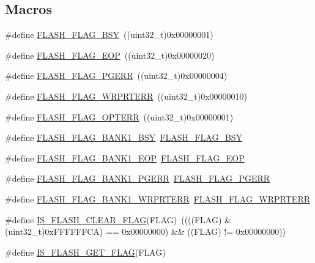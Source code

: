 \subsection*{Macros}
\begin{DoxyCompactItemize}
\item 
\#define \hyperlink{group___f_l_a_s_h___flags_gad3bc368f954ad7744deda3315da2fff7}{F\+L\+A\+S\+H\+\_\+\+F\+L\+A\+G\+\_\+\+B\+SY}~((uint32\+\_\+t)0x00000001)
\item 
\#define \hyperlink{group___f_l_a_s_h___flags_gaf043ba4d8f837350bfc7754a99fae5a9}{F\+L\+A\+S\+H\+\_\+\+F\+L\+A\+G\+\_\+\+E\+OP}~((uint32\+\_\+t)0x00000020)
\item 
\#define \hyperlink{group___f_l_a_s_h___flags_gae2ef62dee0a5ca01e6226746039b6f20}{F\+L\+A\+S\+H\+\_\+\+F\+L\+A\+G\+\_\+\+P\+G\+E\+RR}~((uint32\+\_\+t)0x00000004)
\item 
\#define \hyperlink{group___f_l_a_s_h___flags_ga5c59a7f07507cac38091275964d3d35d}{F\+L\+A\+S\+H\+\_\+\+F\+L\+A\+G\+\_\+\+W\+R\+P\+R\+T\+E\+RR}~((uint32\+\_\+t)0x00000010)
\item 
\#define \hyperlink{group___f_l_a_s_h___flags_gac36b0605df97c9414933369a32251e4a}{F\+L\+A\+S\+H\+\_\+\+F\+L\+A\+G\+\_\+\+O\+P\+T\+E\+RR}~((uint32\+\_\+t)0x00000001)
\item 
\#define \hyperlink{group___f_l_a_s_h___flags_ga1f85e6d511503886e9fbe7d0228c97a4}{F\+L\+A\+S\+H\+\_\+\+F\+L\+A\+G\+\_\+\+B\+A\+N\+K1\+\_\+\+B\+SY}~\hyperlink{group___f_l_a_s_h___flags_gad3bc368f954ad7744deda3315da2fff7}{F\+L\+A\+S\+H\+\_\+\+F\+L\+A\+G\+\_\+\+B\+SY}
\item 
\#define \hyperlink{group___f_l_a_s_h___flags_gafa7670ee5ce8a2eb1f64c458a9f08e5b}{F\+L\+A\+S\+H\+\_\+\+F\+L\+A\+G\+\_\+\+B\+A\+N\+K1\+\_\+\+E\+OP}~\hyperlink{group___f_l_a_s_h___flags_gaf043ba4d8f837350bfc7754a99fae5a9}{F\+L\+A\+S\+H\+\_\+\+F\+L\+A\+G\+\_\+\+E\+OP}
\item 
\#define \hyperlink{group___f_l_a_s_h___flags_gaa1056ffdd1c434a2967d5ed7c0d263be}{F\+L\+A\+S\+H\+\_\+\+F\+L\+A\+G\+\_\+\+B\+A\+N\+K1\+\_\+\+P\+G\+E\+RR}~\hyperlink{group___f_l_a_s_h___flags_gae2ef62dee0a5ca01e6226746039b6f20}{F\+L\+A\+S\+H\+\_\+\+F\+L\+A\+G\+\_\+\+P\+G\+E\+RR}
\item 
\#define \hyperlink{group___f_l_a_s_h___flags_ga1646345adbcda773ef25785b1bdc4c43}{F\+L\+A\+S\+H\+\_\+\+F\+L\+A\+G\+\_\+\+B\+A\+N\+K1\+\_\+\+W\+R\+P\+R\+T\+E\+RR}~\hyperlink{group___f_l_a_s_h___flags_ga5c59a7f07507cac38091275964d3d35d}{F\+L\+A\+S\+H\+\_\+\+F\+L\+A\+G\+\_\+\+W\+R\+P\+R\+T\+E\+RR}
\item 
\#define \hyperlink{group___f_l_a_s_h___flags_ga82f8c6104c348d6aa47c7658ed3b6b36}{I\+S\+\_\+\+F\+L\+A\+S\+H\+\_\+\+C\+L\+E\+A\+R\+\_\+\+F\+L\+AG}(F\+L\+AG)~((((F\+L\+AG) \& (uint32\+\_\+t)0x\+F\+F\+F\+F\+F\+F\+C\+A) == 0x00000000) \&\& ((\+F\+L\+A\+G) != 0x00000000))
\item 
\#define \hyperlink{group___f_l_a_s_h___flags_ga61b60325cd94e1608e34afc7aff20ee4}{I\+S\+\_\+\+F\+L\+A\+S\+H\+\_\+\+G\+E\+T\+\_\+\+F\+L\+AG}(F\+L\+AG)
\end{DoxyCompactItemize}


